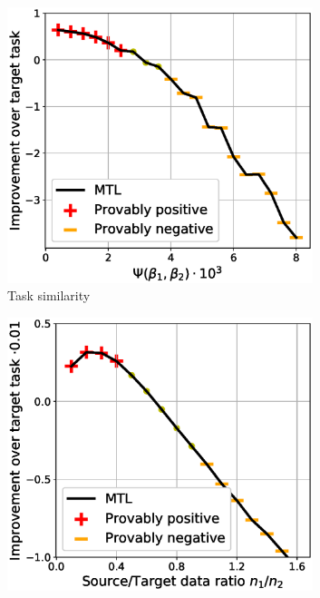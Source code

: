 \begin{figure}
	\begin{subfigure}[b]{0.32\textwidth}
		\centering
		\includegraphics[width=0.98\textwidth]{figures/model_shift_phase_transition.eps}
		\caption{Task similarity}
		\label{fig_model_shift}
	\end{subfigure}\hfill
	\begin{subfigure}[b]{0.32\textwidth}
		\centering
		\includegraphics[width=0.98\textwidth]{figures/datapoints_phase_transition.eps}

\end{subfigure}
\end{figure}
